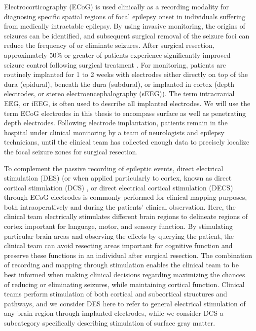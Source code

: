 Electrocorticography (ECoG) is used clinically as a recording modality for diagnosing specific spatial regions of focal epilepsy onset in individuals suffering from medically intractable epilepsy. By using invasive monitoring, the origins of seizures can be identified, and subsequent surgical removal of the seizure foci can reduce the frequency of or eliminate seizures. After surgical resection, approximately 50\% or greater of patients experience significantly improved seizure control following surgical treatment \cite{Englot2014}. For monitoring, patients are routinely implanted for 1 to 2 weeks with electrodes either directly on top of the dura (epidural), beneath the dura (subdural), or implanted in cortex (depth electrodes, or stereo electroencephalography (sEEG)). The term intracranial EEG, or iEEG, is often used to describe all implanted electrodes. We will use the term ECoG electrodes in this thesis to encompass surface as well as penetrating depth electrodes. Following electrode implantation, patients remain in the hospital under clinical monitoring by a team of neurologists and epilepsy technicians, until the clinical team has collected enough data to precisely localize the focal seizure zones for surgical resection. 

To complement the passive recording of epileptic events, direct electrical stimulation (DES) \cite{Vincent2016} (or when applied particularly to cortex, known as direct cortical stimulation (DCS) \cite{Giussani2010}, or direct electrical cortical stimulation (DECS) through ECoG electrodes is commonly performed for clinical mapping purposes, both intraoperatively and during the patients’ clinical observation. Here, the clinical team electrically stimulates different brain regions to delineate regions of cortex important for language, motor, and sensory function. By stimulating particular brain areas and observing the effects by querying the patient, the clinical team can avoid resecting areas important for cognitive function and preserve these functions in an individual after surgical resection. The combination of recording and mapping through stimulation enables the clinical team to be best informed when making clinical decisions regarding maximizing the chances of reducing or eliminating seizures, while maintaining cortical function. Clinical teams perform stimulation of both cortical and subcortical structures and pathways, and we consider DES here to refer to general electrical stimulation of any brain region through implanted electrodes, while we consider DCS a subcategory specifically describing stimulation of surface gray matter. 

